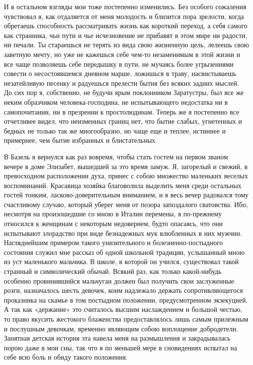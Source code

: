 И  в остальном  взгляды мои  тоже постепенно  изменились. Без  особого
сожаления чувствовал  я, как отдаляется  от меня молодость  и близится
пора  зрелости, когда  обретаешь способность  рассматривать жизнь  как
короткий  переход,  а  себя  самого  как странника,  чьи  пути  и  чье
исчезновение  не  прибавят в  этом  мире  ни  радости, ни  печали.  Ты
стараешься  не  терять  из  вида свою  жизненную  цель,  лелеешь  свою
заветную  мечту, но  уже не  кажешься себе  чем-то незаменимым  в этой
жизни  и  все  чаще  позволяешь  себе передышку  в  пути,  не  мучаясь
более  угрызениями совести  о несостоявшемся  дневном марше,  ложишься
в  траву,  насвистываешь  незатейливую песенку  и  радуешься  прелести
бытия  без  всяких  задних  мыслей.  До  сих  пор  я,  собственно,  не
будучи  ярым  поклонником  Заратустры,  был все  же  неким  образчиком
человека-господина, не испытывающего недостатка ни в самопочитании, ни
в презрении  к простолюдинам.  Теперь же  я постепенно  все отчетливее
видел,  что неизменных  границ  нет, что  бытие  слабых, угнетенных  и
бедных не только так же многообразно, но чаще еще и теплее, истиннее и
примернее, чем бытие избранных и блистательных.

В  Базель  я   вернулся  как  раз  вовремя,  чтобы   стать  гостем  на
первом  званом  вечере   в  доме  Элизабет,  вышедшей   за  это  время
замуж.  Я,  загорелый  и  свежий, в  превосходном  расположении  духа,
принес  с собою  множество маленьких  веселых воспоминаний.  Красавица
хозяйка  благоволила  выделить  меня среди  остальных  гостей  тонким,
ласково-доверительным  вниманием,  и  я   весь  вечер  радовался  тому
счастливому  случаю,   который  уберег  меня  от   позора  запоздалого
сватовства. Ибо, несмотря  на произошедшие со мною  в Италии перемены,
я  по-прежнему  относился к  женщинам  с  некоторым недоверием,  будто
опасаясь,  что  они испытывают  злорадство  при  виде безнадежных  мук
влюбленных в них мужчин.  Нагляднейшим примером такого унизительного и
болезненно-постыдного состояния  служил мне рассказ об  одной школьной
традиции,  услышанный мною  из  уст маленького  мальчика.  В школе,  в
которой он учился, существовал  такой странный и символический обычай.
Всякий раз,  как только какой-нибудь особенно  провинившийся мальчуган
должен был получить свои заслуженные розги, назначалось шесть девочек,
коим надлежало  держать сопротивляющегося  проказника на скамье  в том
постыдном положении, предусмотренном экзекуцией.  А так как «держание»
это считалось высшим  наслаждением и большой честью,  то право вкусить
жестокого блаженства предоставлялось лишь  самым прилежным и послушным
девочкам,  временно являющим  собою  воплощение добродетели.  Занятная
детская история эта  навела меня на размышления  и закрадывалась порою
даже в  мои сны, так  что я по меньшей  мере в сновидениях  испытал на
себе всю боль и обиду такого положения.


